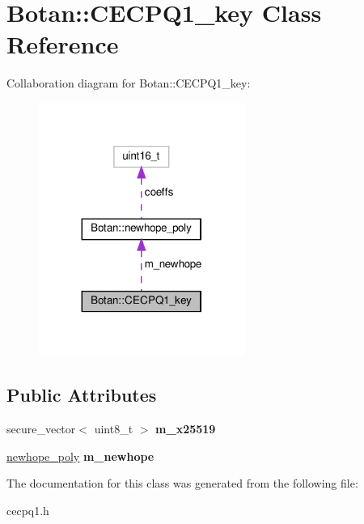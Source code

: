 \hypertarget{class_botan_1_1_c_e_c_p_q1__key}{}\section{Botan\+:\+:C\+E\+C\+P\+Q1\+\_\+key Class Reference}
\label{class_botan_1_1_c_e_c_p_q1__key}


Collaboration diagram for Botan\+:\+:C\+E\+C\+P\+Q1\+\_\+key\+:
\nopagebreak
\begin{figure}[H]
\begin{center}
\leavevmode
\includegraphics[width=191pt]{class_botan_1_1_c_e_c_p_q1__key__coll__graph}
\end{center}
\end{figure}
\subsection*{Public Attributes}
\begin{DoxyCompactItemize}
\item 
\mbox{\label{class_botan_1_1_c_e_c_p_q1__key_aac00b84d096dbad58ffd418a894f6117}} 
secure\+\_\+vector$<$ uint8\+\_\+t $>$ {\bfseries m\+\_\+x25519}
\item 
\mbox{\label{class_botan_1_1_c_e_c_p_q1__key_ab14450eae8238368bdd1388fd1e0e867}} 
\hyperlink{class_botan_1_1newhope__poly}{newhope\+\_\+poly} {\bfseries m\+\_\+newhope}
\end{DoxyCompactItemize}


The documentation for this class was generated from the following file\+:\begin{DoxyCompactItemize}
\item 
cecpq1.\+h\end{DoxyCompactItemize}

